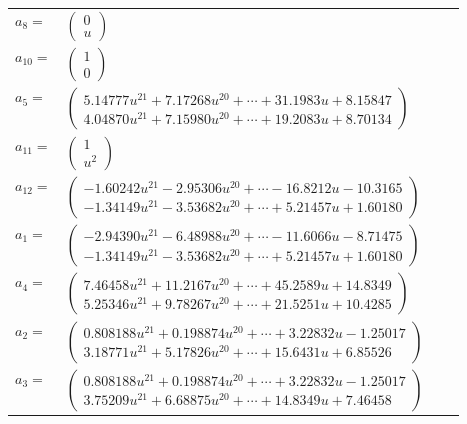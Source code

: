\documentclass[1p]{elsarticle_modified}
\theoremstyle{definition}
\begin{document}
\begin{tabular}{m{7pt} m{180pt} m{7pt} m{180pt} }
\flushright $a_{8}=$&$\begin{pmatrix}0\\u\end{pmatrix}$ \\
\flushright $a_{10}=$&$\begin{pmatrix}1\\0\end{pmatrix}$ \\
\flushright $a_{5}=$&$\begin{pmatrix}5.14777 u^{21}+7.17268 u^{20}+\cdots+31.1983 u+8.15847\\4.04870 u^{21}+7.15980 u^{20}+\cdots+19.2083 u+8.70134\end{pmatrix}$ \\
\flushright $a_{11}=$&$\begin{pmatrix}1\\u^2\end{pmatrix}$ \\
\flushright $a_{12}=$&$\begin{pmatrix}-1.60242 u^{21}-2.95306 u^{20}+\cdots-16.8212 u-10.3165\\-1.34149 u^{21}-3.53682 u^{20}+\cdots+5.21457 u+1.60180\end{pmatrix}$ \\
\flushright $a_{1}=$&$\begin{pmatrix}-2.94390 u^{21}-6.48988 u^{20}+\cdots-11.6066 u-8.71475\\-1.34149 u^{21}-3.53682 u^{20}+\cdots+5.21457 u+1.60180\end{pmatrix}$ \\
\flushright $a_{4}=$&$\begin{pmatrix}7.46458 u^{21}+11.2167 u^{20}+\cdots+45.2589 u+14.8349\\5.25346 u^{21}+9.78267 u^{20}+\cdots+21.5251 u+10.4285\end{pmatrix}$ \\
\flushright $a_{2}=$&$\begin{pmatrix}0.808188 u^{21}+0.198874 u^{20}+\cdots+3.22832 u-1.25017\\3.18771 u^{21}+5.17826 u^{20}+\cdots+15.6431 u+6.85526\end{pmatrix}$ \\
\flushright $a_{3}=$&$\begin{pmatrix}0.808188 u^{21}+0.198874 u^{20}+\cdots+3.22832 u-1.25017\\3.75209 u^{21}+6.68875 u^{20}+\cdots+14.8349 u+7.46458\end{pmatrix}$ \\

\end{tabular}
\end{document}
